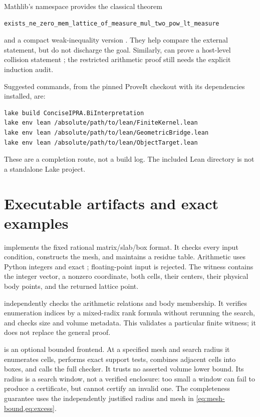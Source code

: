 Mathlib's  namespace provides
the classical theorem
\begin{lstlisting}
exists_ne_zero_mem_lattice_of_measure_mul_two_pow_lt_measure
\end{lstlisting}
and a compact weak-inequality version
\cite{mathlib-minkowski}. They help compare the
external statement, but do not discharge the
 goal.
Similarly, 
can prove a host-level collision statement
\cite{mathlib-pigeonhole}; the restricted arithmetic
proof still needs the explicit induction audit.

Suggested commands, from the pinned ProveIt checkout
with its dependencies installed, are:
\begin{lstlisting}
lake build ConciseIPRA.BiInterpretation
lake env lean /absolute/path/to/lean/FiniteKernel.lean
lake env lean /absolute/path/to/lean/GeometricBridge.lean
lake env lean /absolute/path/to/lean/ObjectTarget.lean
\end{lstlisting}
These are a completion route, not a build log.
The included Lean directory is not a standalone
Lake project.

\section{Executable artifacts and exact examples}\label{sec:artifacts}

 implements the fixed rational
matrix/slab/box format. It checks every input
condition, constructs the mesh, and maintains a
residue table. Arithmetic uses Python integers
and exact ; floating-point
input is rejected.
The witness contains the integer vector, a nonzero
coordinate, both cells, their centers, their
physical body points, and the returned lattice
point.

 independently checks the
arithmetic relations and body membership.
It verifies enumeration indices by a mixed-radix
rank formula without rerunning the search, and
checks size and volume metadata.
This validates a particular finite witness;
it does not replace the general proof.

 is an optional
bounded frontend. At a specified mesh and search
radius it enumerates cells, performs exact support
tests, combines adjacent cells into boxes, and
calls the full checker. It trusts no asserted
volume lower bound. Its radius is a search window,
not a verified enclosure: too small a window can
fail to produce a certificate, but cannot certify
an invalid one. The completeness guarantee uses
the independently justified radius and mesh in
\cref{eq:mesh-bound,eq:excess}.

